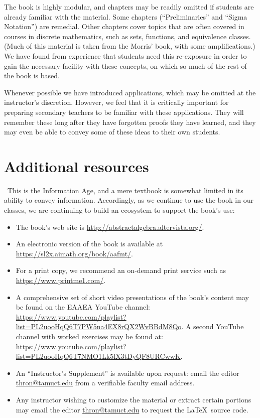 The book is highly modular, and chapters may be readily omitted if students are already familiar with the material. Some chapters  (``Preliminaries'' and ``Sigma Notation'') are remedial. Other chapters cover topics that are often covered in courses in discrete mathematics, such as sets, functions, and equivalence classes. (Much of this material is taken from the Morris' book, with some amplifications.) We have found from experience that students need this re-exposure in order to gain the necessary facility with these concepts, on which so much of the rest of the book is based.

Whenever possible we have introduced applications, which may be omitted at the instructor's discretion. However, we feel that it is critically important for preparing secondary teachers to be familiar with these applications. They will remember these long after they have forgotten proofs they have learned, and they may even be able to convey some of these ideas to their own students. 



\section*{Additional resources}
\label{sec:AdditionalResources}
\
This is the Information Age, and a mere textbook is somewhat limited in its ability to convey information.  Accordingly, as we continue to use the book in our classes, we are continuing to build an ecosystem  to support the book's use:
\begin{itemize}
\item
The book's web site is \url{http://abstractalgebra.altervista.org/}.
\item
An electronic version of the book is available at \url{https://sl2x.aimath.org/book/aafmt/}.
\item
For a print copy, we recommend an on-demand print service such as \url{https://www.printme1.com/}.
\item
 A comprehensive set of short video presentations of the book's content may be found on the EAAEA YouTube channel: \url{https://www.youtube.com/playlist?list=PL2uooHqQ6T7PW5na4EX8rQX2WvBBdM8Qo}. A second YouTube channel with worked exercises may be found at: \url{https://www.youtube.com/playlist?list=PL2uooHqQ6T7NMO1Lk5lX3tDyQF8URCwwK}. 
\item
An ``Instructor's Supplement'' is available upon request: email the editor \href{mailto:thron@tamuct.edu}{thron@tamuct.edu} from a verifiable faculty email address.
\item
Any instructor wishing to customize the material or extract certain portions may email the editor \href{mailto:thron@tamuct.edu}{thron@tamuct.edu}  to request the \LaTeX~source code. 
\end{itemize}


